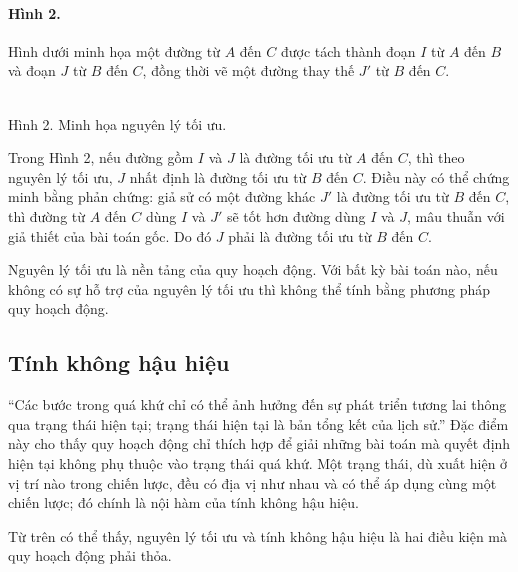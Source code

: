 \documentclass[11pt]{article}
\begin{document}
\paragraph{Hình 2.}
Hình dưới minh họa một đường từ $A$ đến $C$ được tách thành đoạn $I$ từ $A$
đến $B$ và đoạn $J$ từ $B$ đến $C$, đồng thời vẽ một đường thay thế $J'$ từ
$B$ đến $C$.

\begin{center}
\\[-0.2em]
{\small Hình 2. Minh họa nguyên lý tối ưu.}
\end{center}

Trong Hình 2, nếu đường gồm $I$ và $J$ là đường tối ưu từ $A$ đến $C$, thì theo
nguyên lý tối ưu, $J$ nhất định là đường tối ưu từ $B$ đến $C$. Điều này có
thể chứng minh bằng phản chứng: giả sử có một đường khác $J'$ là đường tối ưu
từ $B$ đến $C$, thì đường từ $A$ đến $C$ dùng $I$ và $J'$ sẽ tốt hơn đường dùng
$I$ và $J$, mâu thuẫn với giả thiết của bài toán gốc. Do đó $J$ phải là đường
tối ưu từ $B$ đến $C$.

Nguyên lý tối ưu là nền tảng của quy hoạch động. Với bất kỳ bài toán nào, nếu
không có sự hỗ trợ của nguyên lý tối ưu thì không thể tính bằng phương pháp
quy hoạch động.

\subsection{Tính không hậu hiệu}

``Các bước trong quá khứ chỉ có thể ảnh hưởng đến sự phát triển tương lai
thông qua trạng thái hiện tại; trạng thái hiện tại là bản tổng kết của lịch
sử.'' Đặc điểm này cho thấy quy hoạch động chỉ thích hợp để giải những bài
toán mà quyết định hiện tại không phụ thuộc vào trạng thái quá khứ. Một trạng
thái, dù xuất hiện ở vị trí nào trong chiến lược, đều có địa vị như nhau và
có thể áp dụng cùng một chiến lược; đó chính là nội hàm của tính không hậu
hiệu.

Từ trên có thể thấy, nguyên lý tối ưu và tính không hậu hiệu là hai điều kiện
mà quy hoạch động phải thỏa.
\end{document}
